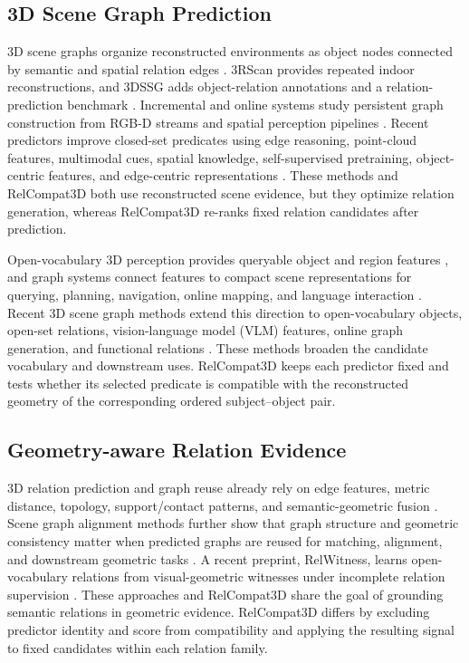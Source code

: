 \documentclass[letterpaper]{article}
\begin{document}
\subsection{3D Scene Graph Prediction}
3D scene graphs organize reconstructed environments as object nodes connected by semantic and spatial relation edges \cite{armeni20193d}.
3RScan provides repeated indoor reconstructions, and 3DSSG adds object-relation annotations and a relation-prediction benchmark \cite{wald2019rio,wald2020learning}. Incremental and online systems study persistent graph construction from RGB-D streams and spatial perception pipelines \cite{wu2021scenegraphfusion,hughes2022hydra}. Recent predictors improve closed-set predicates using edge reasoning, point-cloud features, multimodal cues, spatial knowledge, self-supervised pretraining, object-centric features, and edge-centric representations \cite{zhang2021exploiting,feng20233d,wang2023vl,koch2024sgrec3d,heo2026object,ma2026edge}. These methods and RelCompat3D both use reconstructed scene evidence, but they optimize relation generation, whereas RelCompat3D re-ranks fixed relation candidates after prediction.

Open-vocabulary 3D perception provides queryable object and region features \cite{peng2023openscene,takmaz2023openmask3d}, and graph systems connect features to compact scene representations for querying, planning, navigation, online mapping, and language interaction \cite{gu2024conceptgraphs,werby2024hierarchical,maggio2024clio}. Recent 3D scene graph methods extend this direction to open-vocabulary objects, open-set relations, vision-language model (VLM) features, online graph generation, and functional relations \cite{koch2024open3dsg,chen2024clip,hou2025fross,zhang2025open,wang2025open}. These methods broaden the candidate vocabulary and downstream uses. RelCompat3D keeps each predictor fixed and tests whether its selected predicate is compatible with the reconstructed geometry of the corresponding ordered subject--object pair.

\subsection{Geometry-aware Relation Evidence}
3D relation prediction and graph reuse already rely on edge features, metric distance, topology, support/contact patterns, and semantic-geometric fusion \cite{zhang2021exploiting,feng20233d,xie2024sg,huang2025fireplace,shao2025great,sarkar2023sgaligner}. Scene graph alignment methods further show that graph structure and geometric consistency matter when predicted graphs are reused for matching, alignment, and downstream geometric tasks \cite{sarkar2023sgaligner, xie2024sg}. A recent preprint, RelWitness, learns open-vocabulary relations from visual-geometric witnesses under incomplete relation supervision \cite{nguyen2026relwitness}. These approaches and RelCompat3D share the goal of grounding semantic relations in geometric evidence. RelCompat3D differs by excluding predictor identity and score from compatibility and applying the resulting signal to fixed candidates within each relation family.
\end{document}
